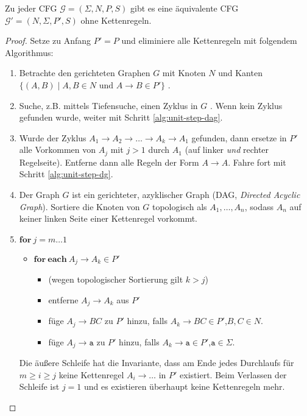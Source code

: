 \begin{lemma}
  Zu jeder CFG $\mathcal{G} = (\Sigma, N, P, S)$ gibt es eine äquivalente CFG $\mathcal{G}' = (N, \Sigma, P', S)$ ohne Kettenregeln.
\end{lemma}
\begin{proof}
  Setze zu Anfang $P' = P$ und eliminiere alle Kettenregeln mit folgendem Algorithmus:
  \begin{enumerate}
  \item Betrachte den gerichteten Graphen $G$ mit Knoten $N$ und Kanten $\{(A, B) \mid A,B \in N \text{ und } A \to B \in P' \}$ \label{alg:unit-step-dg}.
  \item Suche, z.B. mittels Tiefensuche, einen Zyklus in $G$ .
    Wenn kein Zyklus gefunden wurde, weiter mit Schritt \ref{alg:unit-step-dag}.
  \item Wurde der Zyklus $A_1 \to A_2 \to \ldots \to A_k \to A_1$ gefunden, dann ersetze in $P'$ alle Vorkommen von $A_j$ mit $j > 1$ durch $A_1$ (auf linker \emph{und} rechter Regelseite).
    Entferne dann alle Regeln der Form $A \to A$.
    Fahre fort mit Schritt \ref{alg:unit-step-dg}.
  \item \label{alg:unit-step-dag}
    Der Graph $G$ ist ein gerichteter, azyklischer Graph (DAG, \emph{Directed Acyclic Graph}).
    Sortiere die Knoten von $G$ topologisch als $A_1, \ldots, A_n$, sodass $A_n$ auf keiner linken Seite einer Kettenregel vorkommt.
  \item $\mathbf{for}~j = m \ldots 1$
    \begin{itemize}
    \item[] $\mathbf{for}~\mathbf{each}~A_j \to A_k \in P'$
      \begin{itemize}
      \item[] (wegen topologischer Sortierung gilt $k > j$)
      \item[] entferne $A_j \to A_k$ aus $P'$
      \item[] füge $A_j \to BC$ zu $P'$ hinzu, falls $A_k \to BC \in P'$,\quad $B,C \in N$.
      \item[] füge $A_j \to \mathtt{a}$ zu $P'$ hinzu, falls $A_k \to \mathtt{a} \in P'$,\quad $\mathtt{a} \in \Sigma$.
      \end{itemize}
    \end{itemize}
    Die äußere Schleife hat die Invariante, dass am Ende jedes Durchlaufs für $m \ge i \ge j$ keine Kettenregel $A_i \to \ldots$ in $P'$ existiert.
    Beim Verlassen der Schleife ist $j = 1$ und es existieren überhaupt keine Kettenregeln mehr.
  \end{enumerate}
\end{proof}


